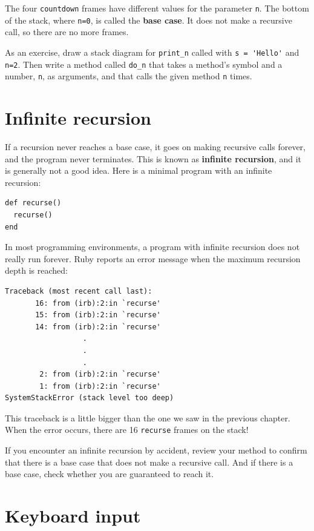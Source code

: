 \documentclass[10pt]{book}
\begin{document}
The four {\tt countdown} frames have different values for the
parameter {\tt n}.  The bottom of the stack, where {\tt n=0}, is
called the {\bf base case}.  It does not make a recursive call, so
there are no more frames.

As an exercise, draw a stack diagram for \verb"print_n" called with
\verb"s = 'Hello'" and {\tt n=2}.
Then write a method called \verb"do_n" that takes a method's
symbol and a number, {\tt n}, as arguments, and that calls
the given method {\tt n} times.


\section{Infinite recursion}

If a recursion never reaches a base case, it goes on making
recursive calls forever, and the program never terminates.  This is
known as {\bf infinite recursion}, and it is generally not
a good idea.  Here is a minimal program with an infinite recursion:

\begin{verbatim}
def recurse()
  recurse()
end
\end{verbatim}
%
In most programming environments, a program with infinite recursion
does not really run forever.  Ruby reports an error
message when the maximum recursion depth is reached:

\begin{verbatim}
Traceback (most recent call last):
       16: from (irb):2:in `recurse'
       15: from (irb):2:in `recurse'
       14: from (irb):2:in `recurse'
                  .
                  .
                  .
        2: from (irb):2:in `recurse'
        1: from (irb):2:in `recurse'
SystemStackError (stack level too deep)
\end{verbatim}
%
This traceback is a little bigger than the one we saw in the
previous chapter.  When the error occurs, there are 16
{\tt recurse} frames on the stack!

If you encounter an infinite recursion by accident, review
your method to confirm that there is a base case that does not
make a recursive call.  And if there is a base case, check whether
you are guaranteed to reach it.


\section{Keyboard input}
\end{document}
